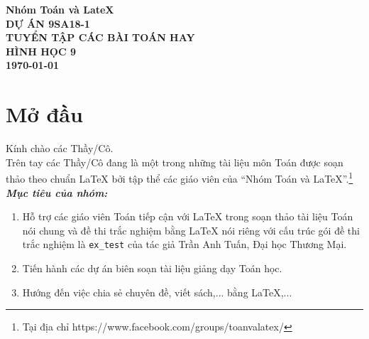 \documentclass[12pt,a4paper]{book}
\theoremstyle{nonumberplain}
\begin{document}
	
\thispagestyle{empty}	
\begin{tcolorbox}[width=.99\textwidth,height=.99\textheight,arc = 2mm, arc is angular]
	\begin{center}
		{\LARGE \bf \color{red} Nhóm Toán và LateX}\\
		\vspace*{.4cm}
		{\large \bf \color{red} DỰ ÁN 9SA18-1}\\	
		\vspace*{9cm}	
		{\bf \fontsize{40}{0}\selectfont T\fontsize{20}{0}\selectfont UYỂN TẬP CÁC BÀI TOÁN HAY \\ HÌNH HỌC 9}\\
		\vspace*{12cm}
		{\large \bf \today}
	\end{center}		
\end{tcolorbox}

\pagestyle{fancy}
\chead{\empty}
\rhead{\currfilename}
\lfoot{\empty}

\tableofcontents

\chapter*{Mở đầu}
Kính chào các Thầy/Cô.\\
Trên tay các Thầy/Cô đang là một trong những tài liệu môn Toán được soạn thảo theo chuẩn \LaTeX{} bởi tập thể các giáo viên của ``Nhóm Toán và LaTeX''.\footnote{Tại địa chỉ https://www.facebook.com/groups/toanvalatex/}\\
\textbf{\textit{Mục tiêu của nhóm:}} 
\begin{enumerate}[\bfseries 1.]
	\item Hỗ trợ các giáo viên Toán tiếp cận với \LaTeX{} trong soạn thảo tài liệu Toán nói chung và đề thi trắc nghiệm bằng \LaTeX{} nói riêng với cấu trúc gói đề thi trắc nghiệm là \texttt{ex\_test} của tác giả Trần Anh Tuấn, Đại học Thương Mại.
	\item Tiến hành các dự án biên soạn tài liệu giảng dạy Toán học.
	\item Hướng đến việc chia sẻ chuyên đề, viết sách,... bằng \LaTeX,...
\end{enumerate}




\end{document}
